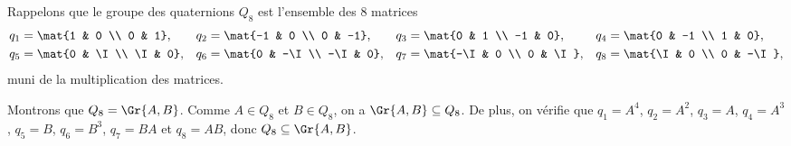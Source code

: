 Rappelons que le groupe des quaternions $Q_8$ est l'ensemble des $8$ matrices
%
\begin{align*}
  q_1 &= \mat{1 & 0 \\ 0 & 1}, & q_2 &= \mat{-1 & 0 \\ 0 & -1}, 
                              & q_3 &= \mat{0 & 1 \\ -1 & 0}, 
                              & q_4 &= \mat{0 & -1 \\ 1 & 0}, \\
  q_5 &= \mat{0 & \I \\ \I & 0}, & q_6 &= \mat{0 & -\I \\ -\I & 0}, 
                                & q_7 &= \mat{-\I & 0 \\ 0 & \I},
                                & q_8 &= \mat{\I & 0 \\ 0 & -\I},
\end{align*}
%
muni de la multiplication des matrices. 

Montrons que $Q_8 = \Gr{A,B}$. Comme $A\in Q_8$ et $B\in Q_8$, on a
$\Gr{A,B}\subseteq Q_8$.
De plus, on vérifie que 
$q_1 = A^4$, $q_2 = A^2$, $q_3 = A$, $q_4 = A^3$, $q_5 = B$, 
$q_6 = B^3$, $q_7 = BA$ et $q_8 = AB$, 
donc $Q_8\subseteq \Gr{A,B}$. 
